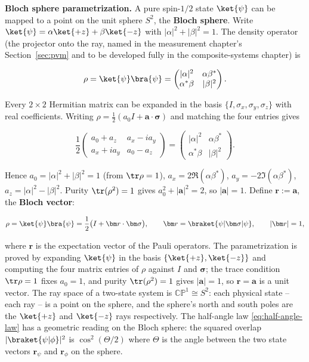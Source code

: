 \medskip\noindent\textbf{Bloch sphere parametrization.}
A pure spin-$1/2$ state $\ket{\psi}$ can be mapped to a point on the unit sphere $S^2$, the \textbf{Bloch sphere}. Write $\ket{\psi} = \alpha\ket{+z} + \beta\ket{-z}$ with $|\alpha|^2+|\beta|^2=1$. The density operator (the projector onto the ray, named in the measurement chapter's Section~\ref{sec:pvm} and to be developed fully in the composite-systems chapter) is
\begin{linenomath}
\begin{equation*}
\rho = \ket{\psi}\bra{\psi}
= \begin{pmatrix}
    |\alpha|^2 & \alpha\beta^* \\
    \alpha^*\beta & |\beta|^2
  \end{pmatrix}.
\end{equation*}
\end{linenomath}
Every $2\times2$ Hermitian matrix can be expanded in the basis $\{I,\sigma_x,\sigma_y,\sigma_z\}$ with real coefficients. Writing $\rho = \frac12(a_0 I + \bm a\cdot\bm\sigma)$ and matching the four entries gives
\begin{linenomath}
\begin{equation*}
\frac12\begin{pmatrix} a_0 + a_z & a_x - i a_y \\ a_x + i a_y & a_0 - a_z \end{pmatrix}
= \begin{pmatrix} |\alpha|^2 & \alpha\beta^* \\ \alpha^*\beta & |\beta|^2 \end{pmatrix}.
\end{equation*}
\end{linenomath}
Hence $a_0 = |\alpha|^2+|\beta|^2 = 1$ (from $\tr\rho=1$), $a_x = 2\Re(\alpha\beta^*)$, $a_y = -2\Im(\alpha\beta^*)$, $a_z = |\alpha|^2-|\beta|^2$. Purity $\tr(\rho^2)=1$ gives $a_0^2 + |\bm a|^2 = 2$, so $|\bm a|=1$. Define $\bm r := \bm a$, the \textbf{Bloch vector}:
\begin{linenomath}
  \begin{equation}
    \rho = \ket{\psi}\bra{\psi} = \frac12\bigl(I + \bm r\cdot\bm\sigma\bigr),
    \qquad
    \bm r = \braket{\psi|\bm\sigma|\psi},
    \qquad
    |\bm r| = 1,
    \label{eq:bloch-vector}
  \end{equation}
\end{linenomath}
where $\bm r$ is the expectation vector of the Pauli operators. The parametrization is proved by expanding $\ket{\psi}$ in the basis $\{\ket{+z},\ket{-z}\}$ and computing the four matrix entries of $\rho$ against $I$ and $\bm\sigma$; the trace condition $\tr\rho=1$ fixes $a_0=1$, and purity $\tr(\rho^2)=1$ gives $|\bm a|=1$, so $\bm r = \bm a$ is a unit vector. The ray space of a two-state system is $\mathbb{CP}^1 \cong S^2$: each physical state -- each ray -- is a point on the sphere, and the sphere's north and south poles are the $\ket{+z}$ and $\ket{-z}$ rays respectively. The half-angle law \eqref{eq:half-angle-law} has a geometric reading on the Bloch sphere: the squared overlap $|\braket{\psi|\phi}|^2$ is $\cos^2(\Theta/2)$ where $\Theta$ is the angle between the two state vectors $\bm r_\psi$ and $\bm r_\phi$ on the sphere.

